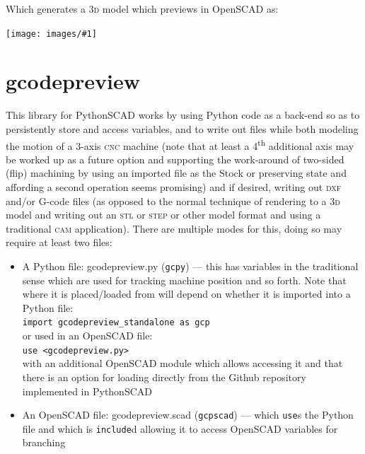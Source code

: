 \documentclass{ltxdoc}
\newcommand{\includeimage}[1]{\bigskip\noindent\texttt{[image: images/\#1]}\bigskip}
\begin{document}
\begin{samepage}
\noindent Which generates a \textsc{3d} model which previews in OpenSCAD as:

\bigskip

\includeimage{gcodepreview_unittests_scad.png}
\end{samepage}

\section{gcodepreview}

This library for PythonSCAD works by using Python code as a back-end so as to persistently store and access variables, and to write out files while both modeling the motion of a 3-axis \textsc{cnc} machine (note that at least a 4\textsuperscript{th} additional axis may be worked up as a future option and supporting the work-around of two-sided (flip) machining by using an imported file as the Stock or preserving state and affording a second operation seems promising) and if desired, writing out \textsc{dxf} and/or G-code files (as opposed to the normal technique of rendering to a \textsc{3d} model and writing out an \textsc{stl} or \textsc{step} or other model format and using a traditional \textsc{cam} application). There are multiple modes for this, doing so may require at least two files:


\begin{itemize}
\item A Python file: gcodepreview.py (\texttt{gcpy}) --- this has
      variables in the traditional sense which are used for tracking machine position and so forth. 
      Note that where it is placed/loaded from will depend on whether it is imported into
      a Python file:\\
      \verb|import gcodepreview_standalone as gcp|\\ 
      or used in an OpenSCAD file:\\
      \verb|use <gcodepreview.py>|\\
      with an additional OpenSCAD module which allows accessing it and that there
      is an option for loading directly from the Github repository implemented in
      PythonSCAD
\item An OpenSCAD file: gcodepreview.scad (\texttt{gcpscad}) --- which \verb|use|s the Python file 
      and which is \texttt{include}d allowing it to access OpenSCAD variables for branching   
\end{itemize}
\end{document}
